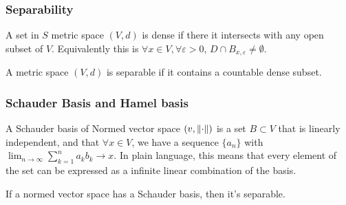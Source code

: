 \documentclass{article}
\begin{document}
\subsubsection{Separability}

\begin{definition}[dense]\rm
	A set in $S$ metric space $(V,d)$ is dense if there it intersects with any open subset of $V$. Equivalently this is $\forall x\in V,\forall \varepsilon>0$, $D\cap B_{x,\varepsilon}\neq \emptyset$.
\end{definition}


\begin{definition}[separable]\rm
	A metric space $(V,d)$ is separable if it contains a countable dense subset.
\end{definition}

\begin{example}\label{separable space example}
\end{example}

\subsubsection{Schauder Basis and Hamel basis}

\begin{definition}\label{Schauder basis}\rm
	A Schauder basis of Normed vector space $(v,\left\|{\cdot}\right\|)$ is a set $B\subset V$ that is linearly independent, and that $\forall x\in V$, we have a sequence $\{a_n\}$ with $\lim_{n\to\infty}\sum_{k=1}^n a_k b_k\to x$. In plain language, this means that every element of the set can be expressed as a infinite linear combination of the basis.
\end{definition}


\begin{proposition}\rm\nextline
	If a normed vector space has a Schauder basis, then it's separable.
\end{proposition}

\begin{definition}\rm\nextline
	\placeholder
\end{definition}

\begin{remark}\rm\nextline
	\placeholder
\end{remark}
\end{document}
